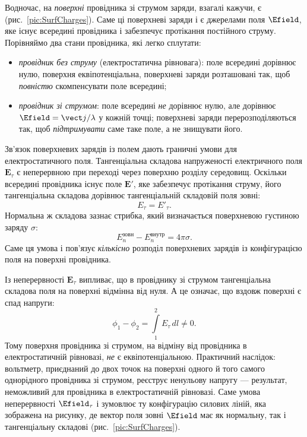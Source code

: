 Водночас, на \emph{поверхні} провідника зі струмом заряди, взагалі кажучи, є (рис.~\ref{pic:SurfCharges}). Саме ці поверхневі заряди і є джерелами
поля $\Efield$, яке існує всередині провідника і забезпечує протікання постійного струму. Порівняймо два стани провідника, які легко
сплутати:

\begin{itemize}
	\item \emph{провідник без струму} (електростатична рівновага): поле всередині дорівнює нулю, поверхня еквіпотенціальна,
	      поверхневі заряди розташовані так, щоб \emph{повністю} скомпенсувати поле всередині;
	\item \emph{провідник зі струмом}: поле всередині \emph{не} дорівнює нулю, але дорівнює $\Efield = \vect j/\lambda$ у кожній точці;
	      поверхневі заряди перерозподіляються так, щоб \emph{підтримувати} саме таке поле, а не знищувати його.
\end{itemize}

Зв'язок поверхневих зарядів із полем дають граничні умови для електростатичного поля. Тангенціальна складова напруженості електричного поля
\(\mathbf{E}_\tau\) є неперервною при переході через поверхню розділу середовищ. Оскільки всередині провідника існує поле \(\mathbf{E}'\), яке
забезпечує протікання струму, його тангенціальна складова дорівнює тангенціальній складовій поля зовні:
\begin{equation}
	E_\tau = E'_\tau.
\end{equation}
Нормальна ж складова зазнає стрибка, який визначається поверхневою густиною заряду $\sigma$:
\begin{equation}\label{eq:NormalFieldJump}
	E_n^{\text{зовн}} - E_n^{\text{внутр}} = 4\pi\sigma.
\end{equation}
Саме ця умова і пов'язує \emph{кількісно} розподіл поверхневих зарядів із конфігурацією поля на поверхні провідника.

Із неперервності \(\mathbf{E}_\tau\) випливає, що в провіднику зі струмом тангенціальна складова поля на поверхні відмінна від нуля. А це
означає, що вздовж поверхні є спад напруги:
\begin{equation}\label{eq:SurfacePotentialDrop}
	\phi_1 - \phi_2 = \int\limits_{1}^{2} E_\tau\, dl \neq 0.
\end{equation}
Тому поверхня провідника зі струмом, на відміну від провідника в електростатичній рівновазі, \emph{не} є еквіпотенціальною. Практичний
наслідок: вольтметр, приєднаний до двох точок на поверхні одного й того самого однорідного провідника зі струмом, реєструє ненульову
напругу --- результат, неможливий для провідника в електростатичній рівновазі. Саме умова неперервності \(\Efield_\tau\) і зумовлює ту
конфігурацію силових ліній, яка зображена на рисунку, де вектор поля зовні \(\Efield\) має як нормальну, так і тангенціальну складові
(рис.~\ref{pic:SurfCharges}).


